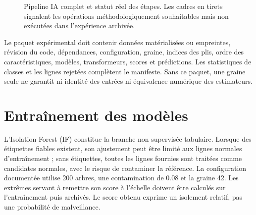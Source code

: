 \documentclass[11pt,a4paper,oneside]{report}
\theoremstyle{definition}
\theoremstyle{plain}
\begin{document}
\begin{figure}[tb]
{}
\caption{Pipeline IA complet et statut réel des étapes. Les cadres en tirets
signalent les opérations méthodologiquement souhaitables mais non exécutées
dans l'expérience archivée.}
\label{fig:data-offline-pipeline}
\end{figure}

Le paquet expérimental doit contenir données matérialisées ou empreintes,
révision du code, dépendances, configuration, graine, indices des plis, ordre
des caractéristiques, modèles, transformeurs, scores et prédictions. Les
statistiques de classes et les lignes rejetées complètent le manifeste. Sans ce
paquet, une graine seule ne garantit ni identité des entrées ni équivalence
numérique des estimateurs.

\section{Entraînement des modèles}

L'Isolation Forest (IF) constitue la branche non supervisée tabulaire. Lorsque
des étiquettes fiables existent, son ajustement peut être limité aux lignes
normales d'entraînement ; sans étiquettes, toutes les lignes fournies sont
traitées comme candidates normales, avec le risque de contaminer la référence.
La configuration documentée utilise 200 arbres, une contamination de 0.08 et
la graine 42. Les extrêmes servant à remettre son score à l'échelle doivent
être calculés sur l'entraînement puis archivés. Le score obtenu exprime un
isolement relatif, pas une probabilité de malveillance.
\end{document}
